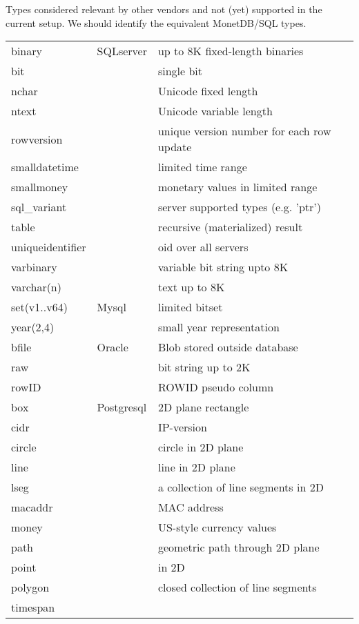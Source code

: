 \documentclass[10pt,twocolumn,fleqn]{article}
\begin{document}
Types considered relevant by other vendors and not (yet) supported in the
current setup. We should identify the equivalent MonetDB/SQL types.

\begin{tabular}{l |l |l}
binary & SQLserver & up to 8K fixed-length binaries\\
bit	&  & single bit\\
nchar	&  & Unicode fixed length\\
ntext	&  & Unicode variable length\\
rowversion&  & unique version number for each row update\\
smalldatetime&  & limited time range\\
smallmoney &  & monetary values in limited range\\
sql\_variant&  & server supported types (e.g. 'ptr')\\
table &  & recursive (materialized) result\\
uniqueidentifier&  & oid over all servers\\
varbinary&  & variable bit string upto 8K\\
varchar(n)&  & text up to 8K\\\hline

set(v1..v64)& Mysql & limited bitset\\
year(2,4) & & small year representation\\\hline

bfile & Oracle & Blob stored outside database\\
raw & & bit string up to 2K\\
rowID & & ROWID pseudo column\\\hline

box	& Postgresql & 2D plane rectangle\\
cidr	& & IP-version\\
circle	& & circle in 2D plane\\
line	& & line in 2D plane\\
lseg	& & a collection of line segments in 2D\\
macaddr & & MAC address\\
money	& & US-style currency values\\
path	& & geometric path through 2D plane\\
point	& & in 2D\\
polygon & & closed collection of line segments\\
timespan & & \\
\end{tabular}
\end{document}

